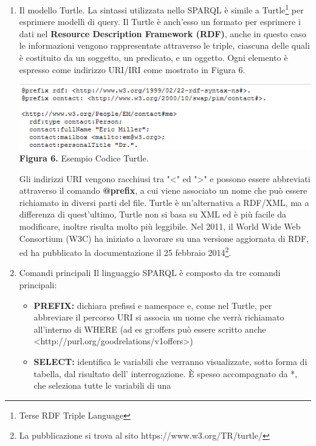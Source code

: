 \documentclass[a4paper,11pt]{article}
\begin{document}
\begin{enumerate}
\begin{enumerate}[label*=\arabic*.]
			\item {Il modello Turtle.}\newline
La sintassi utilizzata nello SPARQL è simile a Turtle\footnote{Terse RDF Triple Language} per esprimere modelli di query. \newline 
Il Turtle è anch'esso un formato per esprimere i dati nel \textbf{Resource Description Framework (RDF)},  anche in questo caso le informazioni vengono rappresentate attraverso le triple, ciascuna delle quali è costituito da un soggetto, un predicato, e un oggetto. Ogni elemento è espresso come indirizzo URI/IRI come mostrato in Figura 6.
			\begin{center}
				\includegraphics[scale=1]{turtle.png}\newline
				\textbf{Figura 6.} Esempio Codice Turtle.
			\end{center}
Gli indirizzi URI vengono racchiusi tra "<" ed ">" e possono essere abbreviati attraverso il comando \textbf{@prefix}, a cui viene associato un nome che può essere richiamato in diversi parti del file.
Turtle è un'alternativa a RDF/XML, ma a differenza di quest'ultimo, Turtle non si basa su XML ed è più facile da modificare, inoltre risulta molto più leggibile.\newline
Nel 2011, il World Wide Web Consortium (W3C) ha iniziato a lavorare su una versione aggiornata di RDF, ed ha pubblicato la documentazione il 25 febbraio 2014\footnote{La pubblicazione si trova al sito https://www.w3.org/TR/turtle/}.
			\item {Comandi principali}\newline
Il linguaggio SPARQL è composto da tre comandi principali:
	\begin{itemize}
		\item \textbf{PREFIX:} dichiara prefissi e namespace e, come nel Turtle, per
abbreviare il percorso URI si associa un nome che verrà
richiamato all'interno di WHERE (ad es gr:offers può essere
scritto anche <http://purl.org/goodrelations/v1offers>)
		\item \textbf{SELECT:} identifica le variabili che verranno visualizzate, sotto forma di tabella, dal risultato dell' interrogazione. È spesso
accompagnato da *, che seleziona tutte le variabili di una

\end{itemize}
\end{enumerate}
\end{enumerate}
\end{document}
